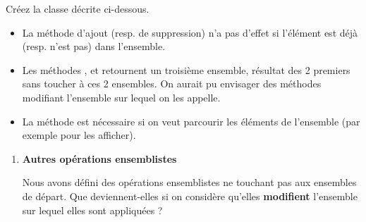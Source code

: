 \begin{enumerate}
			\bigskip
			
			Créez la classe 
			décrite ci-dessous.
			
		\bigskip


		\liststyleListv
		\begin{itemize}
			\item 
				La méthode d'ajout (resp. de suppression) n'a
				pas d'effet si l'élément est déjà
				(resp. n'est pas) dans l'ensemble.
			\item 
				Les méthodes , 
				 et 
				 retournent un troisième ensemble, 
				résultat des 2 premiers sans toucher
				à ces 2 ensembles. On aurait pu envisager des méthodes modifiant
				l'ensemble sur lequel on les appelle.
			\item 
				La méthode 
				est nécessaire si on veut parcourir les éléments de
				l'ensemble (par exemple pour les afficher).
		\end{itemize}
	\end{enumerate}
	
	\liststyleExercice
	\setcounter{saveenum}{\value{enumi}}
	\begin{enumerate}
	\setcounter{enumi}{\value{saveenum}}
	\item {\sffamily\bfseries
	Autres opérations ensemblistes}
		
		Nous avons défini des opérations ensemblistes ne touchant pas aux
		ensembles de départ. Que deviennent-elles si on considère
		qu'elles \textbf{modifient}
		l'ensemble sur lequel elles sont appliquées ?
	\end{enumerate}

